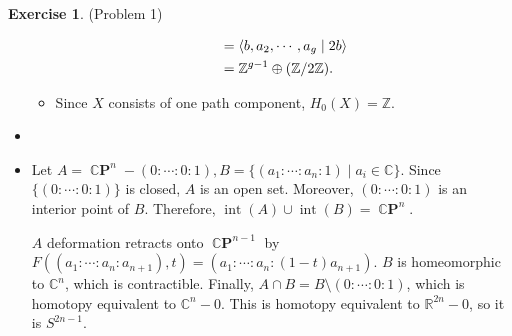 \documentclass[psamsfonts]{amsart}
\theoremstyle{definition}
\newtheorem*{exer}{Exercise}
\theoremstyle{remark}
\DeclareMathOperator{\Int}{int}
\DeclareMathOperator{\CP}{\mathbb{C}\mathbf{P}}
\numberwithin{equation}{section}
\begin{document}
\begin{exer}{(Problem 1)}
\begin{itemize}
\begin{itemize}
\begin{align*}
               &= \ev{b, a_2, \cdots, a_g \mid 2b} \\
               &= \mathbb{Z}^{g - 1} \oplus (\mathbb{Z}/2\mathbb{Z}).
           \end{align*}
         \item
           Since $X$ consists of one path component, $H_0(X) = \mathbb{Z}$.
       \end{itemize}
     \item
     \item
       Let $A = \CP^n - (0: \cdots : 0:1), B = \{ (a_1: \cdots : a_n:1) \mid a_i \in \mathbb{C} \}$.
       Since $\{ (0: \cdots :0:1) \}$ is closed, $A$ is an open set.
       Moreover, $(0: \cdots :0:1)$ is an interior point of $B$.
       Therefore, $\Int(A) \cup \Int(B) = \CP^n$.

       $A$ deformation retracts onto $\CP^{n - 1}$ by $F((a_1:\cdots :a_n:a_{n + 1}), t) = (a_1:\cdots : a_n:(1 - t)a_{n + 1})$.
       $B$ is homeomorphic to $\mathbb{C}^n$, which is contractible.
       Finally, $A \cap B = B \setminus (0 : \cdots : 0 : 1)$, which is homotopy equivalent to $\mathbb{C}^{n} - 0$.
       This is homotopy equivalent to $\mathbb{R}^{2n} - 0$, so it is $S^{2n - 1}$.


\end{itemize}
\end{exer}
\end{document}

